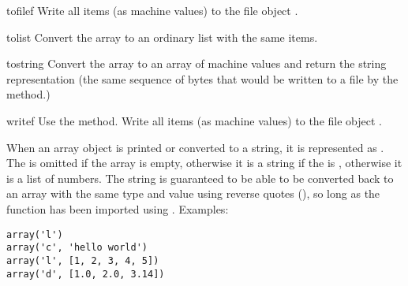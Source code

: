 \begin{methoddesc}[array]{tofile}{f}
Write all items (as machine values) to the file object .
\end{methoddesc}

\begin{methoddesc}[array]{tolist}{}
Convert the array to an ordinary list with the same items.
\end{methoddesc}

\begin{methoddesc}[array]{tostring}{}
Convert the array to an array of machine values and return the
string representation (the same sequence of bytes that would
be written to a file by the  method.)
\end{methoddesc}

\begin{methoddesc}[array]{write}{f}
  {Use the  method.}
Write all items (as machine values) to the file object .
\end{methoddesc}

When an array object is printed or converted to a string, it is
represented as .  The
 is omitted if the array is empty, otherwise it is a
string if the  is , otherwise it is a list of
numbers.  The string is guaranteed to be able to be converted back to
an array with the same type and value using reverse quotes
(), so long as the  function has been
imported using .  Examples:

\begin{verbatim}
array('l')
array('c', 'hello world')
array('l', [1, 2, 3, 4, 5])
array('d', [1.0, 2.0, 3.14])
\end{verbatim}


\begin{seealso}
\end{seealso}
